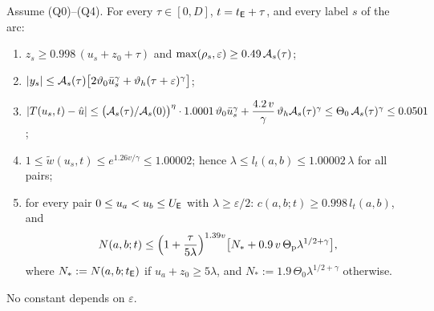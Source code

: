 \begin{theorem}\label{thm:T2-D}
Assume \textup{(Q0)--(Q4)}. For every $\tau\in[0,D]$, $t=t_{\mathsf E}+\tau$, and every label $s$ of the arc:
\begin{enumerate}
\item[(i)] $z_s\ge0.998\,(u_s+z_0+\tau)$ and $\max(\rho_s,\varepsilon)\ge0.49\,\mathcal A_s(\tau)$;
\item[(ii)] $|y_s|\le\mathcal A_s(\tau)\bigl[2\vartheta_0\bar u_s^\gamma+\vartheta_h(\tau+\varepsilon)^\gamma\bigr]$;
\item[(iii)] $|T(u_s,t)-\hat u|\le\bigl(\mathcal A_s(\tau)/\mathcal A_s(0)\bigr)^\eta\cdot1.0001\,\vartheta_0\bar u_s^\gamma
+\dfrac{4.2\,v}\gamma\,\vartheta_h\mathcal A_s(\tau)^\gamma\le\Theta_0\,\mathcal A_s(\tau)^\gamma\le0.0501$;
\item[(iv)] $1\le\tilde w(u_s,t)\le e^{1.26v/\gamma}\le1.00002$; hence $\lambda\le l_t(a,b)\le1.00002\,\lambda$ for all pairs;
\item[(v)] for every pair $0\le u_a<u_b\le U_{\mathsf E}$ with $\lambda\ge\varepsilon/2$: $c(a,b;t)\ge0.998\,l_t(a,b)$, and
\[
N(a,b;t)\le\Bigl(1+\frac\tau{5\lambda}\Bigr)^{1.39v}\bigl[N_*+0.9\,v\,\Theta_{\mathrm p}\lambda^{1/2+\gamma}\bigr],
\]
where $N_*:=N(a,b;t_{\mathsf E})$ if $u_a+z_0\ge5\lambda$, and $N_*:=1.9\,\Theta_0\lambda^{1/2+\gamma}$ otherwise.
\end{enumerate}
No constant depends on $\varepsilon$.
\end{theorem}
